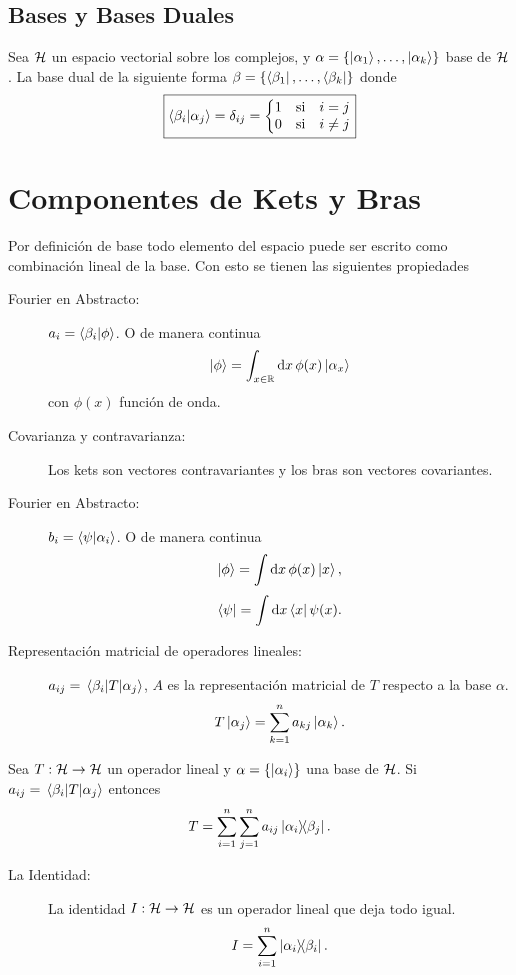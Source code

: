 \subsection{Bases y Bases Duales}

Sea $\mathcal{H}$ un espacio vectorial sobre los complejos, y $\alpha = \{ \ket{\alpha_1},\ldots ,\ket{\alpha _k} \}$ base de $\mathcal{H}$. La base dual de la siguiente forma $\beta = \{ \bra{\beta _1} ,\ldots ,\bra{\beta _k} \}$ donde
	$$ \boxed{ \braket{\beta _i}{\alpha _j} = \delta _{ij} = \left\{ \mqty{1 & \text{si} & i=j \\ 0 & \text{si} & i\neq j} \right. } $$




\section{Componentes de Kets y Bras}
Por definición de base todo elemento del espacio puede ser escrito como combinación lineal de la base. Con esto se tienen las siguientes propiedades
\begin{description}
	\item[Fourier en Abstracto: ] $a_i = \braket{\beta _i}{\phi}$. O de manera continua
		$$ \ket{\phi} = \int _{x\in \mathbb{R}} \dd{x} \phi (x) \ket{\alpha _x} $$
		con $\phi (x)$ función de onda.
	\item[Covarianza y contravarianza: ] Los kets son vectores contravariantes y los bras son vectores covariantes.
	\item[Fourier en Abstracto: ] $b_i = \braket{\psi}{\alpha _i}$. O de manera continua
		$$ \ket{\phi} = \int \dd{x} \phi (x) \ket{x}, $$
		$$ \bra{\psi} = \int \dd{x} \bra{x} \psi (x). $$
	\item[Representación matricial de operadores lineales: ] $a_{ij} = \mel{\beta _i}{T}{\alpha _j}$, $A$ es la representación matricial de $T$ respecto a la base $\alpha$.
		$$ T\ket{\alpha _j} = \sum _{k=1} ^n a_{kj} \ket{\alpha _k}. $$
\end{description}


\begin{teorema}
	Sea $T:\mathcal{H} \to \mathcal{H}$ un operador lineal y $\alpha = \{ \ket{\alpha _i} \}$ una base de $\mathcal{H}$. Si $a_{ij} = \mel{\beta _i}{T}{\alpha _j}$ entonces
		$$ T = \sum_{i=1} ^n \sum _{j=1} ^n a_{ij} \ketbra{\alpha _i}{\beta _j}. $$
\end{teorema}


\begin{description}
	\item[La Identidad: ] La identidad $I:\mathcal{H} \to \mathcal{H}$ es un operador lineal que deja todo igual.
		$$ I = \sum_{i=1} ^n \ketbra{\alpha _i}{\beta _i}. $$
\end{description}



